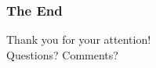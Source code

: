 \begin{frame}
	\frametitle{The End}

	\centering
	\Large{Thank you for your attention!}\\
	\vspace{16pt}
	\normalsize{Questions? Comments?}
\end{frame}